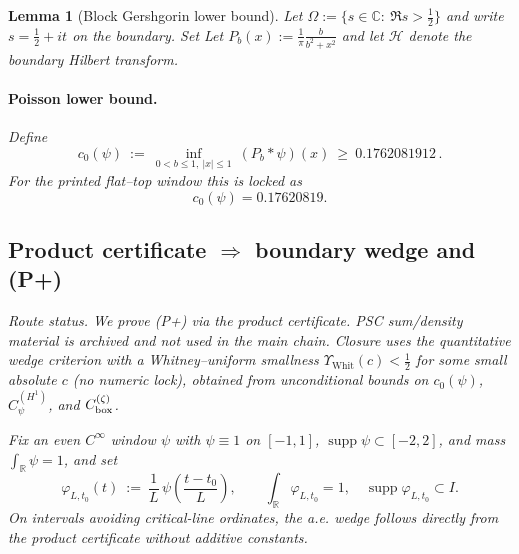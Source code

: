 \documentclass[11pt]{article}
\newtheorem{lemma}{Lemma}[section]
\theoremstyle{definition}
\theoremstyle{remark}
\newcommand{\C}{\mathbb{C}}
\newcommand{\R}{\mathbb{R}}
\newcommand{\Poisson}{P}
\begin{document}
\begin{lemma}[Block Gershgorin lower bound]
Let $\Omega:=\{s\in\C:\ \Re s>\tfrac12\}$ and write $s=\tfrac12+it$ on the boundary.
Set
Let $\Poisson_b(x):=\frac{1}{\pi}\frac{b}{b^2+x^2}$ and let $\mathcal H$ denote the boundary Hilbert transform.


\vspace{1.0cm}
\paragraph{Poisson lower bound.}
Define
\[
 c_0(\psi)\ :=\ \inf_{0<b\le 1,\ |x|\le 1}\ (\Poisson_{b}*\psi)(x)\ \ge\ 0.1762081912\,.
\]
For the printed flat--top window this is locked as
\[
  c_0(\psi)=0.17620819.
  \]






  

\vspace{1.0cm}
\subsection*{Product certificate $\Rightarrow$ boundary wedge and (P+)}
\noindent\textit{Route status.} We prove (P+) via the product certificate. PSC sum/density material is archived and not used in the main chain. \emph{Closure uses the quantitative wedge criterion with a Whitney–uniform smallness $\Upsilon_{\mathrm{Whit}}(c)<\tfrac12$ for some small absolute $c$ (no numeric lock), obtained from unconditional bounds on $c_0(\psi)$, $C_\psi^{(H^1)}$, and $C_{\rm box}^{(\zeta)}$.}

Fix an even $C^\infty$ window $\psi$ with $\psi\equiv 1$ on $[-1,1]$, $\operatorname{supp}\psi\subset[-2,2]$, and mass $\int_\R\psi=1$, and set
\[
  \varphi_{L,t_0}(t)\ :=\ \frac{1}{L}\,\psi\!\left(\frac{t-t_0}{L}\right),\qquad \int_{\R}\!\varphi_{L,t_0}=1,\quad \operatorname{supp}\varphi_{L,t_0}\subset I.
\]
On intervals avoiding critical-line ordinates, the a.e. wedge follows directly from the product certificate without additive constants.






\end{lemma}
\end{document}
